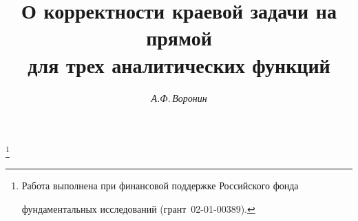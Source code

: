 









\newcommand{\Ind}{\operatorname{Ind}}


\newcommand{\im}{\operatorname{Im}}


\newcommand{\tts}[1]{}







\setcounter{page}{18}















\author{\it А.Ф.\,Воронин}




\title{О корректности краевой задачи на прямой\\


для трех аналитических функций}


\thanks{Работа выполнена при финансовой поддержке Российского фонда 


фундаментальных исследований (грант \No\,02-01-00389).}





\date{}




\pagestyle{plain} %





